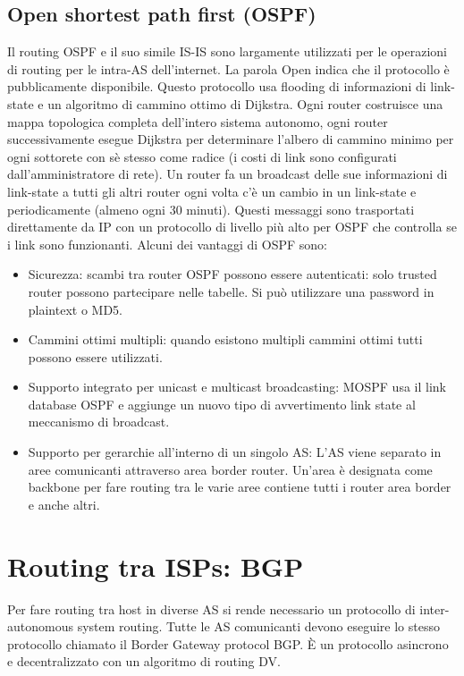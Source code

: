 \subsection{Open shortest path first (OSPF)}
Il routing OSPF e il suo simile IS-IS sono largamente utilizzati per le operazioni di routing per le intra-AS dell'internet. La parola Open indica che il 
protocollo \`e pubblicamente disponibile. Questo protocollo usa flooding di informazioni di link-state e un algoritmo di cammino 
ottimo di Dijkstra. Ogni router costruisce una mappa topologica completa dell'intero sistema autonomo, ogni router successivamente esegue Dijkstra per 
determinare l'albero di cammino minimo per ogni sottorete con s\`e stesso come radice (i costi di link sono configurati dall'amministratore di rete). Un router
fa un broadcast delle sue informazioni di link-state a tutti gli altri router ogni volta c'\`e un cambio in un link-state e periodicamente (almeno ogni 30
minuti). Questi messaggi sono trasportati direttamente da IP con un protocollo di livello pi\`u alto per OSPF che controlla se i link sono funzionanti. 
Alcuni dei vantaggi di OSPF sono:
\begin{itemize}
\item Sicurezza: scambi tra router OSPF possono essere autenticati: solo trusted router possono partecipare nelle tabelle. Si pu\`o utilizzare una password
in plaintext o MD5.
\item Cammini ottimi multipli: quando esistono multipli cammini ottimi tutti possono essere utilizzati. 
\item Supporto integrato per unicast e multicast broadcasting: MOSPF usa il link database OSPF e aggiunge un nuovo tipo di avvertimento link state al 
meccanismo di broadcast.
\item Supporto per gerarchie all'interno di un singolo AS: L'AS viene separato in aree comunicanti attraverso area border router. Un'area \`e designata come
backbone per fare routing tra le varie aree contiene tutti i router area border e anche altri. 
\end{itemize}
\section{Routing tra ISPs: BGP}
Per fare routing tra host in diverse AS si rende necessario un protocollo di inter-autonomous system routing. Tutte le AS comunicanti devono eseguire lo 
stesso protocollo chiamato il Border Gateway protocol BGP. \`E un protocollo asincrono e decentralizzato con un algoritmo di routing DV. 
